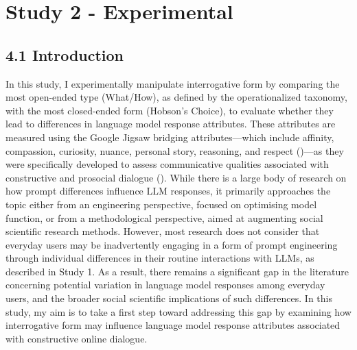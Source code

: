 \documentclass[
  12pt,
]{article}
\begin{document}
\section{Study 2 - Experimental}\label{study-2---experimental}

\subsection{4.1 Introduction}\label{introduction-2}

In this study, I experimentally manipulate interrogative form by comparing the most open-ended type (What/How), as defined by the operationalized taxonomy, with the most closed-ended form (Hobson's Choice), to evaluate whether they lead to differences in language model response attributes. These attributes are measured using the Google Jigsaw bridging attributes---which include affinity, compassion, curiosity, nuance, personal story, reasoning, and respect ()---as they were specifically developed to assess communicative qualities associated with constructive and prosocial dialogue (). While there is a large body of research on how prompt differences influence LLM responses, it primarily approaches the topic either from an engineering perspective, focused on optimising model function, or from a methodological perspective, aimed at augmenting social scientific research methods. However, most research does not consider that everyday users may be inadvertently engaging in a form of prompt engineering through individual differences in their routine interactions with LLMs, as described in Study 1. As a result, there remains a significant gap in the literature concerning potential variation in language model responses among everyday users, and the broader social scientific implications of such differences. In this study, my aim is to take a first step toward addressing this gap by examining how interrogative form may influence language model response attributes associated with constructive online dialogue.
\end{document}
